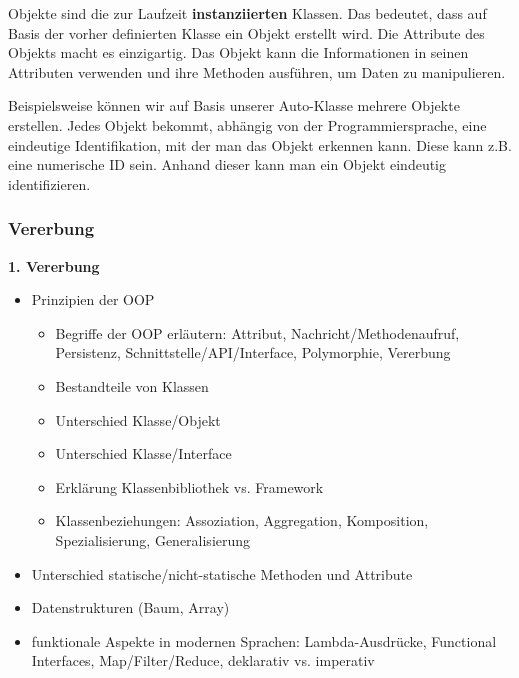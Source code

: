 Objekte sind die zur Laufzeit \textbf{instanziierten} Klassen. Das bedeutet, dass auf Basis der vorher definierten Klasse ein Objekt erstellt wird. Die Attribute des Objekts macht es einzigartig. Das Objekt kann die Informationen in seinen Attributen verwenden und ihre Methoden ausführen, um Daten zu manipulieren.

Beispielsweise können wir auf Basis unserer Auto-Klasse mehrere Objekte erstellen.
Jedes Objekt bekommt, abhängig von der Programmiersprache, eine eindeutige Identifikation, mit der man das Objekt erkennen kann. Diese kann z.B. eine numerische ID sein. Anhand dieser kann man ein Objekt eindeutig identifizieren.

\subsubsection{Vererbung}
\textbf{1. Vererbung}\\

\begin{itemize}
	\item Prinzipien der OOP
	\begin{itemize}
		\item Begriffe der OOP erläutern: Attribut, Nachricht/Methodenaufruf, Persistenz, Schnittstelle/API/Interface, Polymorphie, Vererbung
		\item Bestandteile von Klassen
		\item Unterschied Klasse/Objekt
		\item Unterschied Klasse/Interface
		\item Erklärung Klassenbibliothek vs. Framework
		\item Klassenbeziehungen: Assoziation, Aggregation, Komposition, Spezialisierung, Generalisierung
	\end{itemize}
	\item Unterschied statische/nicht-statische Methoden und Attribute
	\item Datenstrukturen (Baum, Array)
	\item funktionale Aspekte in modernen Sprachen: Lambda-Ausdrücke, Functional Interfaces, Map/Filter/Reduce, deklarativ vs. imperativ
\end{itemize}
